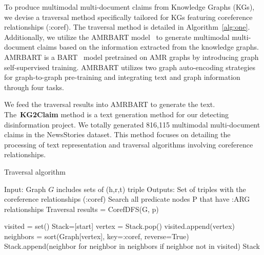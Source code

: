 To produce multimodal multi-document claims from Knowledge Graphs (KGs), we devise a traversal method specifically tailored for KGs featuring coreference relationships (:coref). The traversal method is detailed in Algorithm~\ref{alg:one}. Additionally, we utilize the AMRBART model~\cite{bai2022graph} to generate multimodal multi-document claims based on the information extracted from the knowledge graphs. AMRBART is a BART~\cite{lewis2019bart} model pretrained on AMR graphs by introducing graph self-supervised training. AMRBART utilizes two graph auto-encoding strategies for graph-to-graph pre-training and integrating text and graph information through four tasks.

We feed the traversal results into AMRBART to generate the text. The~\textbf{KG2Claim} method is a text generation method for our detecting disinformation project. We totally generated 816,115 multimodal multi-document claims in the NewsStories dataset. This method focuses on detailing the processing of text representation and traversal algorithms involving coreference relationships.

\begin{algorithm}[H]
\caption{Traversal algorithm}\label{alg:one}
\begin{algorithmic}[1]

\State Input: Graph $G$ includes sets of (h,r,t) triple
\State Outputs: Set of triples with the coreference relationships (:coref)
\State Search all predicate nodes $\mathrm{P}$ that have :ARG relationships 
    \State Traversal results = CorefDFS(G, p)
\EndFor

    \State visited = set()
    \State Stack=[start]
        \State vertex = Stack.pop()
            \State visited.append(vertex)
            \State neighbors = sort(Graph[vertex], key=:coref, reverse=True)
            \State Stack.append(neighbor for neighbor in neighbors if neighbor not in visited)
        \EndIf
    \EndWhile
    \State \Return Stack
\EndFunction 

\end{algorithmic}
\end{algorithm}